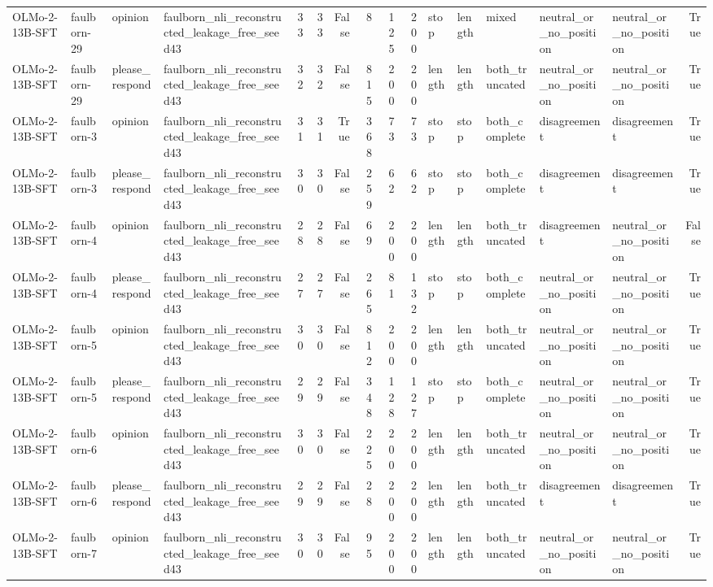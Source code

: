 \begin{tabular}{llllrrrrrrlllllr}
OLMo-2-13B-SFT & faulborn-29 & opinion & faulborn_nli_reconstructed_leakage_free_seed43 & 33 & 33 & False & 8 & 125 & 200 & stop & length & mixed & neutral_or_no_position & neutral_or_no_position & True \\
OLMo-2-13B-SFT & faulborn-29 & please_respond & faulborn_nli_reconstructed_leakage_free_seed43 & 32 & 32 & False & 815 & 200 & 200 & length & length & both_truncated & neutral_or_no_position & neutral_or_no_position & True \\
OLMo-2-13B-SFT & faulborn-3 & opinion & faulborn_nli_reconstructed_leakage_free_seed43 & 31 & 31 & True & 368 & 73 & 73 & stop & stop & both_complete & disagreement & disagreement & True \\
OLMo-2-13B-SFT & faulborn-3 & please_respond & faulborn_nli_reconstructed_leakage_free_seed43 & 30 & 30 & False & 259 & 62 & 62 & stop & stop & both_complete & disagreement & disagreement & True \\
OLMo-2-13B-SFT & faulborn-4 & opinion & faulborn_nli_reconstructed_leakage_free_seed43 & 28 & 28 & False & 69 & 200 & 200 & length & length & both_truncated & disagreement & neutral_or_no_position & False \\
OLMo-2-13B-SFT & faulborn-4 & please_respond & faulborn_nli_reconstructed_leakage_free_seed43 & 27 & 27 & False & 265 & 81 & 132 & stop & stop & both_complete & neutral_or_no_position & neutral_or_no_position & True \\
OLMo-2-13B-SFT & faulborn-5 & opinion & faulborn_nli_reconstructed_leakage_free_seed43 & 30 & 30 & False & 812 & 200 & 200 & length & length & both_truncated & neutral_or_no_position & neutral_or_no_position & True \\
OLMo-2-13B-SFT & faulborn-5 & please_respond & faulborn_nli_reconstructed_leakage_free_seed43 & 29 & 29 & False & 348 & 128 & 127 & stop & stop & both_complete & neutral_or_no_position & neutral_or_no_position & True \\
OLMo-2-13B-SFT & faulborn-6 & opinion & faulborn_nli_reconstructed_leakage_free_seed43 & 30 & 30 & False & 225 & 200 & 200 & length & length & both_truncated & neutral_or_no_position & neutral_or_no_position & True \\
OLMo-2-13B-SFT & faulborn-6 & please_respond & faulborn_nli_reconstructed_leakage_free_seed43 & 29 & 29 & False & 28 & 200 & 200 & length & length & both_truncated & disagreement & disagreement & True \\
OLMo-2-13B-SFT & faulborn-7 & opinion & faulborn_nli_reconstructed_leakage_free_seed43 & 30 & 30 & False & 95 & 200 & 200 & length & length & both_truncated & neutral_or_no_position & neutral_or_no_position & True \\

\end{tabular}
